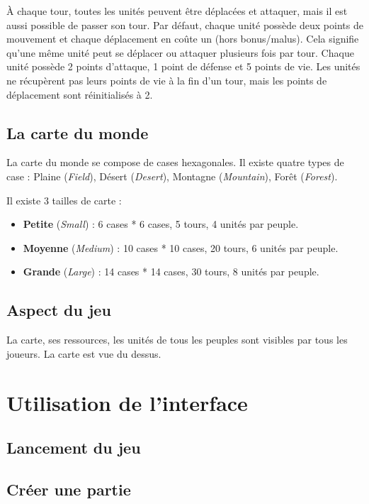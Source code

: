 À chaque tour, toutes les unités peuvent être déplacées et attaquer, mais il est aussi possible de passer son tour. Par défaut, chaque unité possède deux points de mouvement et chaque déplacement en coûte un (hors bonus/malus). Cela signifie qu’une même unité peut se déplacer ou attaquer plusieurs fois par tour. Chaque unité possède 2 points d’attaque, 1 point de défense et 5 points de vie. Les unités ne récupèrent pas leurs points de vie à la fin d’un tour, mais les points de déplacement sont réinitialisés à 2.

\subsection{La carte du monde}

La carte du monde se compose de cases hexagonales. Il existe quatre types de case : Plaine (\textit{Field}), Désert (\textit{Desert}), Montagne (\textit{Mountain}), Forêt (\textit{Forest}). 

Il existe 3 tailles de carte :

\begin{itemize}

\item \textbf{Petite} (\textit{Small}) : 6 cases * 6 cases, 5 tours, 4 unités par peuple.
\item \textbf{Moyenne} (\textit{Medium}) : 10 cases * 10 cases, 20 tours, 6 unités par peuple.
\item \textbf{Grande} (\textit{Large}) : 14 cases * 14 cases, 30 tours, 8 unités par peuple.

\end{itemize}

\subsection{Aspect du jeu}

La carte, ses ressources, les unités de tous les peuples sont visibles par tous les joueurs. La carte est vue du dessus.

\section{Utilisation de l'interface}

\subsection{Lancement du jeu}

\subsection{Créer une partie}

